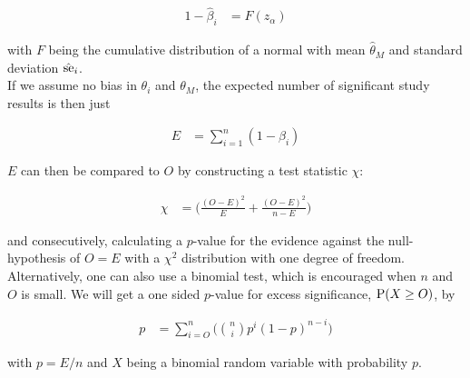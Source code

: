 \documentclass[11pt,a4paper,twoside]{book}\usepackage[]{graphicx}\usepackage[]{color}
\begin{document}
\begin{align}
1 - \hat{\beta}_i &= F(z_\alpha) 
\end{align}

with $F$ being the cumulative distribution of a normal with mean $\hat{\theta}_M$ and standard deviation $\hat{\se}_i$. \\
If we assume no bias in $\theta_i$ and $\theta_M$, the expected number of significant study results is then just

\begin{align}
E &= \sum_{i = 1}^n (1 - \beta_i) \nonumber
\end{align}

$E$ can then be compared to $O$ by constructing a test statistic $\chi$:

\begin{align}
\chi  &= \big( \frac{(O - E)^2}{E} + \frac{(O - E)^2}{n - E}\big) \nonumber
\end{align}

and consecutively, calculating a $p$-value for the evidence against the null-hypothesis of $O = E$ with a $\chi^2$ distribution with one degree of freedom. Alternatively, one can also use a binomial test, which is encouraged when $n$ and $O$ is small. We will get a one sided $p$-value for excess significance, $\P(X \geq O)$, by 

\begin{align}
p &= \sum_{i = O}^n\Big({n \choose i} p^i (1-p)^{n - i}\Big)
\end{align}

with $p = E/n$ and $X$ being a binomial random variable with probability $p$. 





\end{document}
